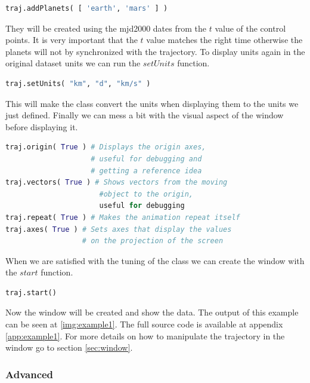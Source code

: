 \documentclass[a4paper,11pt]{article}
\begin{document}
\begin{lstlisting}[language=Python,breakatwhitespace=true]
traj.addPlanets( [ 'earth', 'mars' ] )
\end{lstlisting}

They will be created using the \gls{mjd2000} dates from the $t$ value of the control points. It is very important that the $t$ value matches the right time otherwise the planets will not by synchronized with the trajectory. To display units again in the original dataset units we can run the $setUnits$ function.

\begin{lstlisting}[language=Python,breakatwhitespace=true]
traj.setUnits( "km", "d", "km/s" )
\end{lstlisting}

This will make the class convert the units when displaying them to the units we just defined. Finally we can mess a bit with the visual aspect of the window before displaying it.

\begin{lstlisting}[language=Python,breakatwhitespace=true]
traj.origin( True ) # Displays the origin axes,
                    # useful for debugging and
                    # getting a reference idea
traj.vectors( True ) # Shows vectors from the moving
                      #object to the origin,
                      useful for debugging
traj.repeat( True ) # Makes the animation repeat itself
traj.axes( True ) # Sets axes that display the values
                  # on the projection of the screen
\end{lstlisting}

When we are satisfied with the tuning of the class we can create the window with the $start$ function.

\begin{lstlisting}[language=Python,breakatwhitespace=true]
traj.start()
\end{lstlisting}

Now the window will be created and show the data. The output of this example can be seen at \ref{img:example1}. The full source code is available at appendix \ref{app:example1}. For more details on how to manipulate the trajectory in the window go to section \ref{sec:window}.


\subsubsection{Advanced}\label{sec:advanced}
\end{document}
